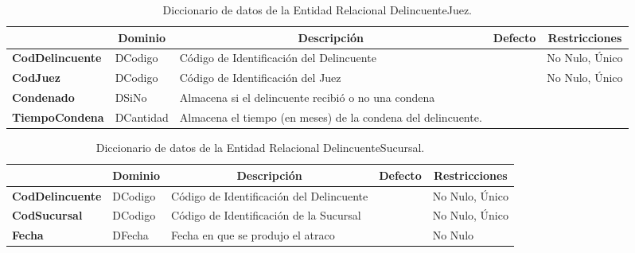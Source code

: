\begin{table}[H]
\centering
\caption{Diccionario de datos de la Entidad Relacional DelincuenteJuez.}
\label{tab-DiccR-2i}
\begin{tabular}{>{\bfseries}m{4.0cm}>{}m{3.0cm}>{}m{6.0cm}>{}m{5.0cm}>{}m{2.0cm}}
\toprule
\multicolumn{1}{c}{\textbf{Atributo}} & \multicolumn{1}{c}{\textbf{Dominio}} & \multicolumn{1}{c}{\textbf{Descripción}} & \multicolumn{1}{c}{\textbf{Defecto}} & \multicolumn{1}{c}{\textbf{Restricciones}} \\ \midrule
CodDelincuente	&	DCodigo	&	Código de Identificación del Delincuente	&		&	No Nulo, Único\\
CodJuez	&	DCodigo	&	Código de Identificación del Juez	&		&	No Nulo, Único\\
Condenado	&	DSiNo	&	Almacena si el delincuente recibió o no una condena	&		&	\\
TiempoCondena	&	DCantidad	&	Almacena el tiempo (en meses) de la condena del delincuente.	&		&	\\
\bottomrule
\end{tabular}
\end{table}

\begin{table}[H]
\centering
\caption{Diccionario de datos de la Entidad Relacional DelincuenteSucursal.}
\label{tab-DiccR-2j}
\begin{tabular}{>{\bfseries}m{4.0cm}>{}m{3.0cm}>{}m{6.0cm}>{}m{5.0cm}>{}m{2.0cm}}
\toprule
\multicolumn{1}{c}{\textbf{Atributo}} & \multicolumn{1}{c}{\textbf{Dominio}} & \multicolumn{1}{c}{\textbf{Descripción}} & \multicolumn{1}{c}{\textbf{Defecto}} & \multicolumn{1}{c}{\textbf{Restricciones}} \\ \midrule
CodDelincuente	&	DCodigo	&	Código de Identificación del Delincuente	&		&	No Nulo, Único\\
CodSucursal	&	DCodigo	&	Código de Identificación de la Sucursal	&		&	No Nulo, Único\\
Fecha	&	DFecha	&	Fecha en que se produjo el atraco	&		&	No Nulo \\
\bottomrule
\end{tabular}
\end{table}

